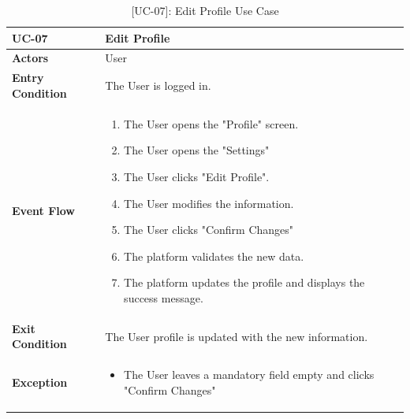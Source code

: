 \begin{table}[H]
    \centering
    \setlength\extrarowheight{2pt}
    \renewcommand{\arraystretch}{1.2}
    \begin{tabularx}{\textwidth}{|>{\bfseries}l|X|}
    \hline
    UC-07 & Edit Profile \\ \hline
    Actors & User\\ \hline
    Entry Condition & The User is logged in.\\ \hline
    Event Flow & 
    \begin{enumerate}
      \item The User opens the "Profile" screen.
      \item The User opens the "Settings"
      \item The User clicks "Edit Profile".
      \item The User modifies the information.
      \item The User clicks "Confirm Changes"
      \item The platform validates the new data.
      \item The platform updates the profile and displays the success message.
    \end{enumerate}
    \\ \hline
    Exit Condition &  The User profile is updated with the new information.\\ \hline
    Exception & 
    \begin{itemize}
        \item The User leaves a mandatory field empty and clicks "Confirm Changes"
    \end{itemize}
    \\ \hline
   \end{tabularx}
   \caption{[UC-07]: Edit Profile Use Case}
    \label{UC-07}
\end{table}

